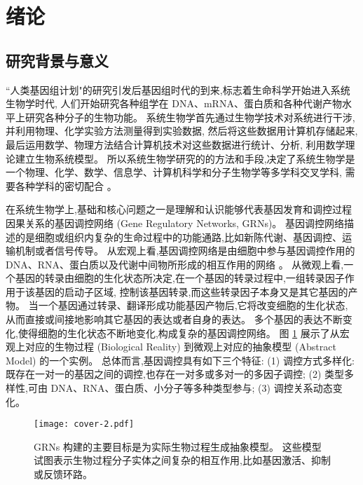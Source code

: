 \section{绪论}
\subsection{研究背景与意义}

``人类基因组计划"的研究引发后基因组时代的到来,标志着生命科学开始进入系统生物学时代,
人们开始研究各种组学在 DNA、mRNA、蛋白质和各种代谢产物水平上研究各种分子的生物功能。
系统生物学首先通过生物学技术对系统进行干涉,并利用物理、化学实验方法测量得到实验数据,
然后将这些数据用计算机存储起来,最后运用数学、物理方法结合计算机技术对这些数据进行统计、分析,
利用数学理论建立生物系统模型。
所以系统生物学研究的的方法和手段,决定了系统生物学是一个物理、化学、数学、信息学、计算机科学和分子生物学等多学科交叉学科,
需要各种学科的密切配合 \cite{ideker2001new}。

在系统生物学上,基础和核心问题之一是理解和认识能够代表基因发育和调控过程因果关系的基因调控网络 (Gene Regulatory Networks, GRNs)。
基因调控网络描述的是细胞或组织内复杂的生命过程中的功能通路,比如新陈代谢、基因调控、运输机制或者信号传导。
从宏观上看,基因调控网络是由细胞中参与基因调控作用的 DNA、RNA、蛋白质以及代谢中间物所形成的相互作用的网络 \cite{de2002modeling}。
从微观上看,一个基因的转录由细胞的生化状态所决定,在一个基因的转录过程中,一组转录因子作用于该基因的启动子区域,
控制该基因转录,而这些转录因子本身又是其它基因的产物。
当一个基因通过转录、翻译形成功能基因产物后,它将改变细胞的生化状态,
从而直接或间接地影响其它基因的表达或者自身的表达。
多个基因的表达不断变化,使得细胞的生化状态不断地变化,构成复杂的基因调控网络。
图 \ref{cover-2} 展示了从宏观上对应的生物过程 (Biological Reality) 到微观上对应的抽象模型 (Abstract Model) 的一个实例。
总体而言,基因调控具有如下三个特征: 
(1) 调控方式多样化: 既存在一对一的基因之间的调控,也存在一对多或多对一的多因子调控;
(2) 类型多样性,可由 DNA、RNA、蛋白质、小分子等多种类型参与;
(3) 调控关系动态变化。

\begin{figure}[!htbp]
    \centering
    \texttt{[image: cover-2.pdf]}
    \caption{GRNs 构建的主要目标是为实际生物过程生成抽象模型。
    这些模型试图表示生物过程分子实体之间复杂的相互作用,比如基因激活、抑制或反馈环路。
    }
    \label{cover-2}
\end{figure}


